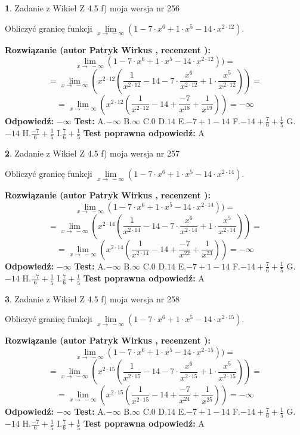 \documentclass[12pt, a4paper]{article}
\theoremstyle{definition} %
\newtheorem{zad}{}
\newcommand{\zadStart}[1]{\begin{zad}#1\newline}
\newcommand{\zadStop}{\end{zad}}
\newcommand{\rozwStart}[2]{\noindent \textbf{Rozwiązanie (autor #1 , recenzent #2): }\newline}
\newcommand{\rozwStop}{\newline}
\newcommand{\odpStart}{\noindent \textbf{Odpowiedź:}\newline}
\newcommand{\odpStop}{\newline}
\newcommand{\testStart}{\noindent \textbf{Test:}\newline}
\newcommand{\testStop}{\newline}
\newcommand{\kluczStart}{\noindent \textbf{Test poprawna odpowiedź:}\newline}
\newcommand{\kluczStop}{\newline}
\begin{document}
\zadStart{Zadanie z Wikieł Z 4.5 f) moja wersja nr 256}



Obliczyć granicę funkcji  $\lim\limits_{x\to\ -\infty}(1 - 7 \cdot x^{6}+1 \cdot x^{5}- 14 \cdot x^{2\cdot12})$.
\zadStop
\rozwStart{Patryk Wirkus}{}
$$\lim\limits_{x\to\ -\infty}(1 - 7 \cdot x^{6}+1 \cdot x^{5}- 14 \cdot x^{2\cdot12}))=$$
$$=\lim\limits_{x\to\ -\infty}(x^{2\cdot12}(\frac{1}{x^{2\cdot12}}-14 -7 \cdot \frac{x^{6}}{x^{2\cdot12}}+1 \cdot \frac{x^{5}}{x^{2\cdot12}}))=$$
$$=\lim\limits_{x\to\ -\infty}(x^{2\cdot12}(\frac{1}{x^{2\cdot12}}-14 + \frac{-7}{x^{18}}+ \frac{1}{x^{19}}))=-\infty$$
\rozwStop
\odpStart
$-\infty$
\odpStop
\testStart
A.$-\infty$ B.$\infty$ C.$0$ D.$14$ E.$-7 + 1 - 14$
F.$-14+\frac{7}{6}+\frac{1}{5}$ G.$-14$
H.$\frac{-7}{6}+\frac{1}{5}$
I.$\frac{7}{6}+\frac{1}{5}$
\testStop
\kluczStart
A
\kluczStop



\zadStart{Zadanie z Wikieł Z 4.5 f) moja wersja nr 257}



Obliczyć granicę funkcji  $\lim\limits_{x\to\ -\infty}(1 - 7 \cdot x^{6}+1 \cdot x^{5}- 14 \cdot x^{2\cdot14})$.
\zadStop
\rozwStart{Patryk Wirkus}{}
$$\lim\limits_{x\to\ -\infty}(1 - 7 \cdot x^{6}+1 \cdot x^{5}- 14 \cdot x^{2\cdot14}))=$$
$$=\lim\limits_{x\to\ -\infty}(x^{2\cdot14}(\frac{1}{x^{2\cdot14}}-14 -7 \cdot \frac{x^{6}}{x^{2\cdot14}}+1 \cdot \frac{x^{5}}{x^{2\cdot14}}))=$$
$$=\lim\limits_{x\to\ -\infty}(x^{2\cdot14}(\frac{1}{x^{2\cdot14}}-14 + \frac{-7}{x^{22}}+ \frac{1}{x^{23}}))=-\infty$$
\rozwStop
\odpStart
$-\infty$
\odpStop
\testStart
A.$-\infty$ B.$\infty$ C.$0$ D.$14$ E.$-7 + 1 - 14$
F.$-14+\frac{7}{6}+\frac{1}{5}$ G.$-14$
H.$\frac{-7}{6}+\frac{1}{5}$
I.$\frac{7}{6}+\frac{1}{5}$
\testStop
\kluczStart
A
\kluczStop



\zadStart{Zadanie z Wikieł Z 4.5 f) moja wersja nr 258}



Obliczyć granicę funkcji  $\lim\limits_{x\to\ -\infty}(1 - 7 \cdot x^{6}+1 \cdot x^{5}- 14 \cdot x^{2\cdot15})$.
\zadStop
\rozwStart{Patryk Wirkus}{}
$$\lim\limits_{x\to\ -\infty}(1 - 7 \cdot x^{6}+1 \cdot x^{5}- 14 \cdot x^{2\cdot15}))=$$
$$=\lim\limits_{x\to\ -\infty}(x^{2\cdot15}(\frac{1}{x^{2\cdot15}}-14 -7 \cdot \frac{x^{6}}{x^{2\cdot15}}+1 \cdot \frac{x^{5}}{x^{2\cdot15}}))=$$
$$=\lim\limits_{x\to\ -\infty}(x^{2\cdot15}(\frac{1}{x^{2\cdot15}}-14 + \frac{-7}{x^{24}}+ \frac{1}{x^{25}}))=-\infty$$
\rozwStop
\odpStart
$-\infty$
\odpStop
\testStart
A.$-\infty$ B.$\infty$ C.$0$ D.$14$ E.$-7 + 1 - 14$
F.$-14+\frac{7}{6}+\frac{1}{5}$ G.$-14$
H.$\frac{-7}{6}+\frac{1}{5}$
I.$\frac{7}{6}+\frac{1}{5}$
\testStop
\kluczStart
A
\kluczStop
\end{document}
